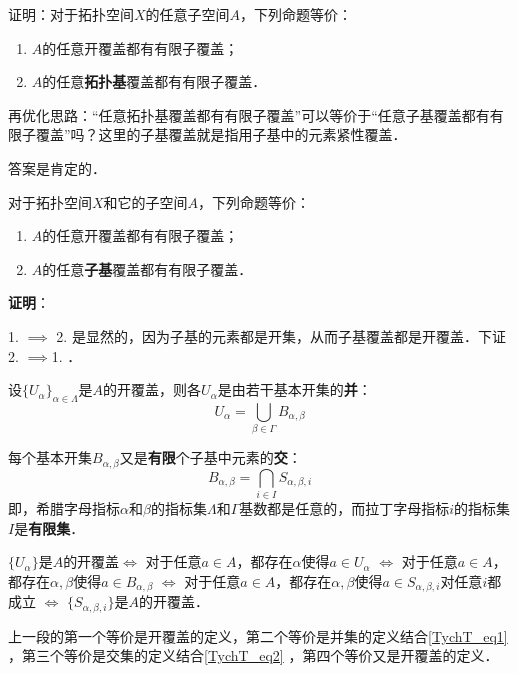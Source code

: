 \begin{exercise}{}
证明：对于拓扑空间$X$的任意子空间$A$，下列命题等价：
\begin{enumerate}
\item $A$的任意开覆盖都有有限子覆盖；
\item $A$的任意\textbf{拓扑基}覆盖都有有限子覆盖．
\end{enumerate}
\end{exercise}

再优化思路：“任意拓扑基覆盖都有有限子覆盖”可以等价于“任意子基覆盖都有有限子覆盖”吗？这里的子基覆盖就是指用子基中的元素紧性覆盖．

答案是肯定的．

\begin{theorem}{}
对于拓扑空间$X$和它的子空间$A$，下列命题等价：
\begin{enumerate}
\item $A$的任意开覆盖都有有限子覆盖；
\item $A$的任意\textbf{子基}覆盖都有有限子覆盖．
\end{enumerate}
\end{theorem}

\textbf{证明}：

1. $\implies$ 2. 是显然的，因为子基的元素都是开集，从而子基覆盖都是开覆盖．下证 2. $\implies$1. ．

设$\{U_\alpha\}_{\alpha\in\Lambda}$是$A$的开覆盖，则各$U_\alpha$是由若干基本开集的\textbf{并}：
\begin{equation}\label{TychT_eq1}
U_\alpha = \bigcup_{\beta\in \Gamma} B_{\alpha, \beta}
\end{equation}

每个基本开集$B_{\alpha, \beta}$又是\textbf{有限}个子基中元素的\textbf{交}：
\begin{equation}\label{TychT_eq2}
B_{\alpha, \beta} = \bigcap_{i\in I} S_{\alpha, \beta, i}
\end{equation}
即，希腊字母指标$\alpha$和$\beta$的指标集$\Lambda$和$\Gamma$基数都是任意的，而拉丁字母指标$i$的指标集$I$是\textbf{有限集}．

$\{U_\alpha\}$是$A$的开覆盖$\iff$ 对于任意$a\in A$，都存在$\alpha$使得$a\in U_\alpha$ $\iff$ 对于任意$a\in A$，都存在$\alpha, \beta$使得$a\in B_{\alpha, \beta}$ $\iff$ 对于任意$a\in A$，都存在$\alpha, \beta$使得$a\in S_{\alpha, \beta, i}$对任意$i$都成立 $\iff$ $\{S_{\alpha, \beta, i}\}$是$A$的开覆盖．

上一段的第一个等价是开覆盖的定义，第二个等价是并集的定义结合\autoref{TychT_eq1} ，第三个等价是交集的定义结合\autoref{TychT_eq2} ，第四个等价又是开覆盖的定义．

